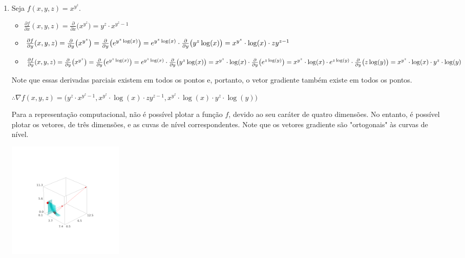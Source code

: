 \documentclass[../main.tex]{subfiles}
\begin{document}
\begin{solucao}
\begin{enumerate}[label=\arabic.]
\begin{enumerate}[label=\alph*)]
						\item Seja $f(x,y,z)=x^{y^z}$.
						\begin{itemize}
							\item $\frac{\partial f}{\partial x}(x,y,z)=\frac{\partial }{\partial x}\big(x^{y^z}\big)=y^z\cdot x^{y^z-1}$
							\item $\frac{\partial f}{\partial y}(x,y,z)=\frac{\partial }{\partial y}\big(x^{y^z}\big)=\frac{\partial }{\partial y}\big(e^{y^z\log(x)}\big)=e^{y^z\log(x)}\cdot \frac{\partial }{\partial y}\big(y^z\log(x)\big)\\=x^{y^z}\cdot \log(x)\cdot zy^{z-1}$
							\item $\frac{\partial f}{\partial y}(x,y,z)=\frac{\partial }{\partial y}\big(x^{y^z}\big)=\frac{\partial }{\partial y}\big(e^{y^z\log(x)}\big)=e^{y^z\log(x)}\cdot \frac{\partial }{\partial y}\big(y^z\log(x)\big)\\=x^{y^z}\cdot \log(x)\cdot \frac{\partial }{\partial y}\big(e^{z\log(y)}\big)=x^{y^z}\cdot \log(x)\cdot e^{z\log(y)}\cdot \frac{\partial }{\partial y}\big(z\log(y)\big)\\=x^{y^z}\cdot \log(x)\cdot y^z\cdot \log(y)$
						\end{itemize}
						Note que essas derivadas parciais existem em todos os pontos e, portanto, o vetor gradiente também existe em todos os pontos.
						
						$\therefore \nabla f(x,y,z)=\big(y^z\cdot x^{y^z-1},x^{y^z}\cdot \log(x)\cdot zy^{z-1},x^{y^z}\cdot \log(x)\cdot y^z\cdot \log(y)\big)$
						
						Para a representação computacional, não é possível plotar a função $f$, devido ao seu caráter de quatro dimensões. No entanto, é possível plotar os vetores, de três dimensões, e as cuvas de nível correspondentes. Note que os vetores gradiente são "ortogonais" às curvas de nível.
						
						\begin{center}
							\includegraphics[width=0.25\textwidth]{imagens/lista04/picture_lista04.02_q02_item01.06.png}
						\end{center}
						
					\end{enumerate}
			\end{enumerate}
		\end{solucao}
		
\end{document}
